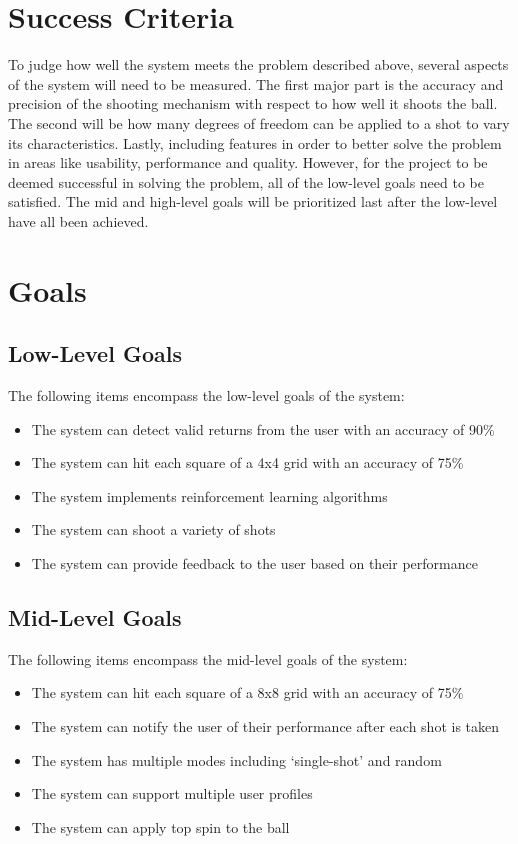 \documentclass[11pt]{article}
\begin{document}
\section{Success Criteria}
To judge how well the system meets the problem described above, several aspects of the system will need to be measured. The first major part is the accuracy and precision of the shooting mechanism with respect to how well it shoots the ball. The second will be how many degrees of freedom can be applied to a shot to vary its characteristics. Lastly, including features in order to better solve the problem in areas like usability, performance and quality. However, for the project to be deemed successful in solving the problem, all of the low-level goals need to be satisfied. The mid and high-level goals will be prioritized last after the low-level have all been achieved.
\section{Goals}
\subsection{Low-Level Goals}
The following items encompass the low-level goals of the system:
\begin{itemize}
\item The system can detect valid returns from the user with an accuracy of 90\%
\item The system can hit each square of a 4x4 grid with an accuracy of 75\%
\item The system implements reinforcement learning algorithms
\item The system can shoot a variety of shots 
\item The system can provide feedback to the user based on their performance
\end{itemize}
\subsection{Mid-Level Goals}
The following items encompass the mid-level goals of the system:
\begin{itemize}
\item The system can hit each square of a 8x8 grid with an accuracy of 75\%
\item The system can notify the user of their performance after each shot is taken
\item The system has multiple modes including `single-shot' and random
\item The system can support multiple user profiles
\item The system can apply top spin to the ball
\end{itemize}
\end{document}
